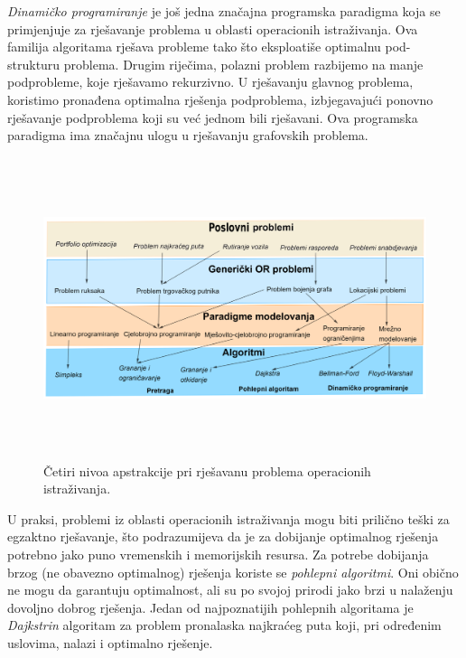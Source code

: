 \documentclass[b5paper, utf8, 11pt, colorlinks]{book}
\theoremstyle{definition}
\begin{document}
\emph{Dinamičko programiranje} je još jedna značajna programska paradigma  koja se primjenjuje za rješavanje problema u oblasti operacionih istraživanja. Ova familija algoritama rješava probleme tako što eksploatiše optimalnu pod-strukturu problema. Drugim riječima, polazni problem razbijemo na manje podprobleme, koje rješavamo rekurzivno. U rješavanju glavnog problema, koristimo pronađena optimalna rješenja podproblema, izbjegavajući ponovno rješavanje podproblema koji su već jednom bili rješavani. Ova programska paradigma ima značajnu ulogu u rješavanju grafovskih problema. 
 \begin{figure}
	\centering 
	\includegraphics[width=\textwidth,height=250pt]{overview.eps}
	\caption{Četiri nivoa apstrakcije pri rješavanu problema operacionih istraživanja.}
	\label{fig:OR_four_levels}
\end{figure}
U praksi, problemi iz oblasti operacionih istraživanja mogu biti prilično teški za egzaktno rješavanje, što podrazumijeva da je za dobijanje optimalnog rješenja potrebno jako puno vremenskih i memorijskih resursa. Za potrebe dobijanja brzog (ne obavezno optimalnog) rješenja  koriste se \emph{pohlepni algoritmi}. Oni obično ne mogu 
da garantuju optimalnost, ali su   po svojoj prirodi jako brzi u nalaženju dovoljno dobrog rješenja. Jedan od najpoznatijih pohlepnih algoritama je \emph{Dajkstrin} algoritam za problem pronalaska najkraćeg puta koji, pri određenim uslovima, nalazi i optimalno rješenje. 

 
\end{document}
